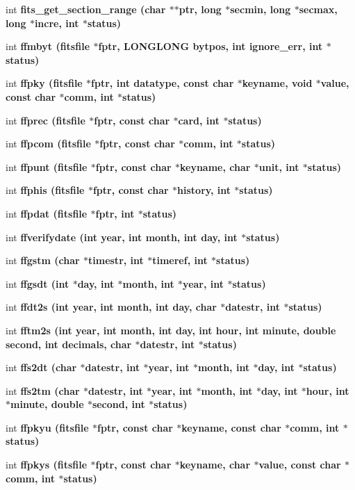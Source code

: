 \begin{CompactItemize}
\item 
int \bf{fits\_\-get\_\-section\_\-range} (char $\ast$$\ast$ptr, long $\ast$secmin, long $\ast$secmax, long $\ast$incre, int $\ast$status)
\item 
int \bf{ffmbyt} (\bf{fitsfile} $\ast$fptr, \bf{LONGLONG} bytpos, int ignore\_\-err, int $\ast$status)
\item 
int \bf{ffpky} (\bf{fitsfile} $\ast$fptr, int \bf{datatype}, const char $\ast$keyname, void $\ast$value, const char $\ast$comm, int $\ast$status)
\item 
int \bf{ffprec} (\bf{fitsfile} $\ast$fptr, const char $\ast$card, int $\ast$status)
\item 
int \bf{ffpcom} (\bf{fitsfile} $\ast$fptr, const char $\ast$comm, int $\ast$status)
\item 
int \bf{ffpunt} (\bf{fitsfile} $\ast$fptr, const char $\ast$keyname, char $\ast$unit, int $\ast$status)
\item 
int \bf{ffphis} (\bf{fitsfile} $\ast$fptr, const char $\ast$history, int $\ast$status)
\item 
int \bf{ffpdat} (\bf{fitsfile} $\ast$fptr, int $\ast$status)
\item 
int \bf{ffverifydate} (int year, int month, int day, int $\ast$status)
\item 
int \bf{ffgstm} (char $\ast$timestr, int $\ast$timeref, int $\ast$status)
\item 
int \bf{ffgsdt} (int $\ast$day, int $\ast$month, int $\ast$year, int $\ast$status)
\item 
int \bf{ffdt2s} (int year, int month, int day, char $\ast$datestr, int $\ast$status)
\item 
int \bf{fftm2s} (int year, int month, int day, int hour, int minute, double second, int decimals, char $\ast$datestr, int $\ast$status)
\item 
int \bf{ffs2dt} (char $\ast$datestr, int $\ast$year, int $\ast$month, int $\ast$day, int $\ast$status)
\item 
int \bf{ffs2tm} (char $\ast$datestr, int $\ast$year, int $\ast$month, int $\ast$day, int $\ast$hour, int $\ast$minute, double $\ast$second, int $\ast$status)
\item 
int \bf{ffpkyu} (\bf{fitsfile} $\ast$fptr, const char $\ast$keyname, const char $\ast$comm, int $\ast$status)
\item 
int \bf{ffpkys} (\bf{fitsfile} $\ast$fptr, const char $\ast$keyname, char $\ast$value, const char $\ast$comm, int $\ast$status)
\item 
$$
\end{CompactItemize}
